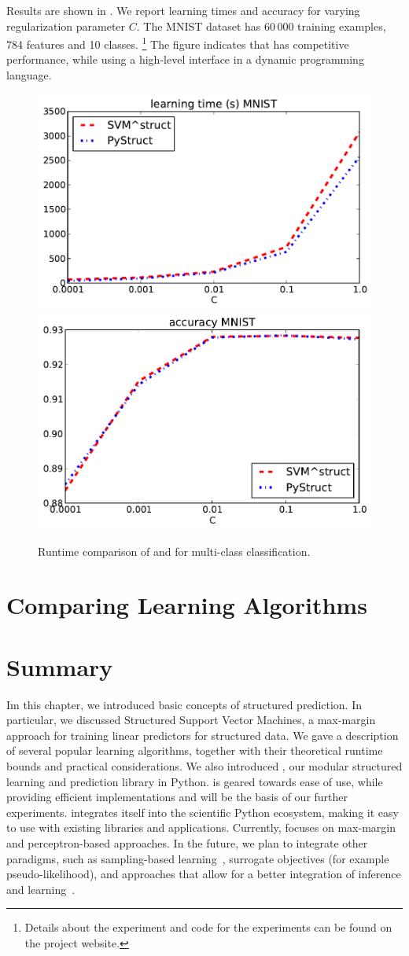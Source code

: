 Results are shown in . We report learning times and accuracy for
varying regularization parameter $C$. The MNIST dataset has 60\,000 training
examples, 784 features and 10 classes.%
\footnote{Details about the experiment and code for the experiments can be found on the project website.}
The figure indicates that \pystruct has competitive performance, while using
a high-level interface in a dynamic programming language.

\begin{figure}
\centering
\includegraphics[width=.49\textwidth]{times_MNIST}
\includegraphics[width=.49\textwidth]{accs_MNIST}
\caption{Runtime comparison of \pystruct and \svmstruct for multi-class
    classification.
}
\label{fig:timings}
\end{figure}

\section{Comparing Learning Algorithms}

\section{Summary}
Im this chapter, we introduced basic concepts of structured prediction. In particular, we discussed
Structured Support Vector Machines, a max-margin approach for training linear predictors for
structured data. %
We gave a description of several popular learning algorithms, together with their theoretical
runtime bounds and practical considerations.
We also introduced \pystruct, our modular structured learning and prediction library in Python.
\pystruct is geared towards ease of use, while providing efficient implementations and will be the
basis of our further experiments.
\pystruct integrates itself into the scientific Python ecosystem, making it easy to use with
existing libraries and applications.
Currently, \pystruct focuses on max-margin and perceptron-based approaches.
In the future, we plan to integrate other paradigms, such as sampling-based
learning~\citep{wick2011samplerank}, surrogate objectives (for example
pseudo-likelihood), and approaches that allow for a better integration of
inference and learning~\citep{meshi2010learning}.

